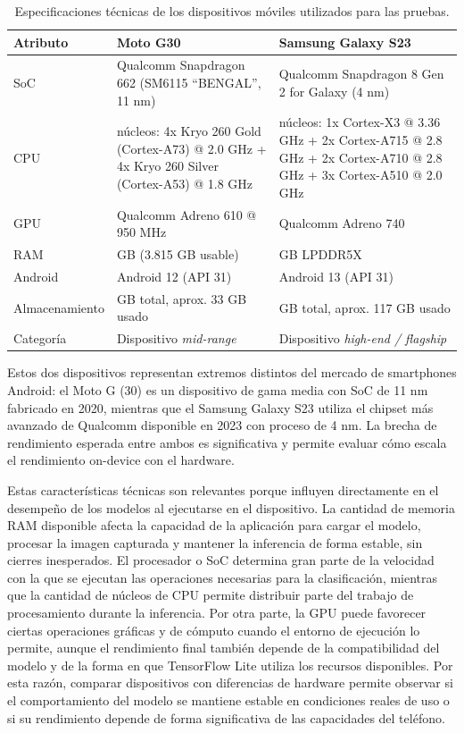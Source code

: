 \begin{table}[H]
    \centering
    \caption{Especificaciones técnicas de los dispositivos móviles utilizados para las pruebas.}
    \label{tab:device_specs}
    \small
    \begin{tabular}{>{\raggedright\arraybackslash}p{3cm}
                    >{\raggedright\arraybackslash}p{5.1cm}
                    >{\raggedright\arraybackslash}p{5.1cm}}
        \hline
        \textbf{Atributo} & \textbf{Moto G30} & \textbf{Samsung Galaxy S23} \\
        \hline
        SoC & Qualcomm Snapdragon 662 (SM6115 ``BENGAL'', 11 nm) & Qualcomm Snapdragon 8 Gen 2 for Galaxy (4 nm) \\
        CPU & 8 núcleos: 4x Kryo 260 Gold (Cortex-A73) @ 2.0 GHz + 4x Kryo 260 Silver (Cortex-A53) @ 1.8 GHz & 10 núcleos: 1x Cortex-X3 @ 3.36 GHz + 2x Cortex-A715 @ 2.8 GHz + 2x Cortex-A710 @ 2.8 GHz + 3x Cortex-A510 @ 2.0 GHz \\
        GPU & Qualcomm Adreno 610 @ 950 MHz & Qualcomm Adreno 740 \\
        RAM & 4 GB (3.815 GB usable) & 8 GB LPDDR5X \\
        Android & Android 12 (API 31) & Android 13 (API 31) \\
        Almacenamiento & 128 GB total, aprox. 33 GB usado & 256 GB total, aprox. 117 GB usado \\
        Categoría & Dispositivo \textit{mid-range} & Dispositivo \textit{high-end / flagship} \\
        \hline
    \end{tabular}
\end{table}

Estos dos dispositivos representan extremos distintos del mercado de smartphones Android: el Moto G (30) es un dispositivo de gama media 
con SoC de 11 nm fabricado en 2020, mientras que el Samsung Galaxy S23 utiliza el chipset más avanzado de Qualcomm disponible en 2023 
con proceso de 4 nm. La brecha de rendimiento esperada entre ambos es significativa y permite evaluar cómo escala el rendimiento on-device
con el hardware.

Estas características técnicas son relevantes porque influyen directamente en el desempeño de los modelos al ejecutarse en el dispositivo.
La cantidad de memoria RAM disponible afecta la capacidad de la aplicación para cargar el modelo, procesar la imagen capturada y mantener
la inferencia de forma estable, sin cierres inesperados. El procesador o SoC determina gran parte de la velocidad con la que se ejecutan
las operaciones necesarias para la clasificación, mientras que la cantidad de núcleos de CPU permite distribuir parte del trabajo de
procesamiento durante la inferencia. Por otra parte, la GPU puede favorecer ciertas operaciones gráficas y de cómputo cuando el entorno
de ejecución lo permite, aunque el rendimiento final también depende de la compatibilidad del modelo y de la forma en que TensorFlow Lite
utiliza los recursos disponibles. Por esta razón, comparar dispositivos con diferencias de hardware permite observar si el comportamiento
del modelo se mantiene estable en condiciones reales de uso o si su rendimiento depende de forma significativa de las capacidades del
teléfono.


